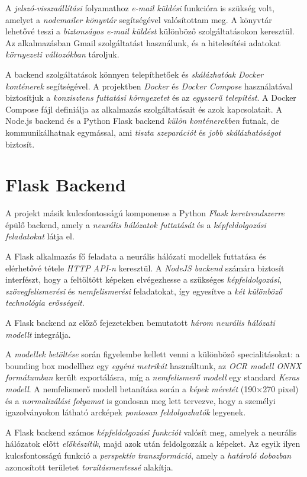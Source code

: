 \documentclass[
]{thesis-ekf}
\theoremstyle{definition}
\theoremstyle{remark}
\begin{document}
A \emph{jelszó-visszaállítási} folyamathoz \emph{e-mail küldési} funkcióra is szükség volt, amelyet a \emph{nodemailer könyvtár} segítségével valósítottam meg. A könyvtár lehetővé teszi a \emph{biztonságos e-mail küldést} különböző szolgáltatásokon keresztül. Az alkalmazásban Gmail szolgáltatást használunk, és a hitelesítési adatokat \emph{környezeti változókban} tároljuk.

A backend szolgáltatások könnyen telepíthetőek és \emph{skálázhatóak} \emph{Docker konténerek} segítségével. A projektben \emph{Docker} és \emph{Docker Compose} használatával biztosítjuk a \emph{konzisztens futtatási környezetet} és az \emph{egyszerű telepítést}. A Docker Compose fájl definiálja az alkalmazás szolgáltatásait és azok kapcsolatait. A Node.js backend és a Python Flask backend \emph{külön konténerekben} futnak, de kommunikálhatnak egymással, ami \emph{tiszta szeparációt} és \emph{jobb skálázhatóságot} biztosít.

\section{Flask Backend}

A projekt másik kulcsfontosságú komponense a Python \emph{Flask keretrendszerre} épülő backend, amely a \emph{neurális hálózatok futtatását} és a \emph{képfeldolgozási feladatokat} látja el.

A Flask alkalmazás fő feladata a neurális hálózati modellek futtatása és elérhetővé tétele \emph{HTTP API-n} keresztül. A \emph{NodeJS backend} számára biztosít interfészt, hogy a feltöltött képeken elvégezhesse a szükséges \emph{képfeldolgozási}, \emph{szövegfelismerési} és \emph{nemfelismerési} feladatokat, így egyesítve a \emph{két különböző technológia erősségeit}.

A Flask backend az előző fejezetekben bemutatott \emph{három neurális hálózati modellt} integrálja.

A \emph{modellek betöltése} során figyelembe kellett venni a különböző specialitásokat: a bounding box modellhez egy \emph{egyéni metrikát} használtunk, az \emph{OCR modell} \emph{ONNX formátumban} került exportálásra, míg a \emph{nemfelismerő modell} egy standard \emph{Keras modell}. A nemfelismerő modell betanítása során a \emph{képek méretét} (190×270 pixel) és a \emph{normalizálási folyamat} is gondosan meg lett tervezve, hogy a személyi igazolványokon látható arcképek \emph{pontosan feldolgozhatók} legyenek.

A Flask backend számos \emph{képfeldolgozási funkciót} valósít meg, amelyek a neurális hálózatok előtt \emph{előkészítik}, majd azok után feldolgozzák a képeket. Az egyik ilyen kulcsfontosságú funkció a \emph{perspektív transzformáció}, amely a \emph{határoló dobozban} azonosított területet \emph{torzításmentessé} alakítja.
\end{document}
